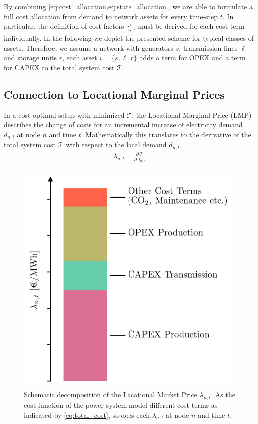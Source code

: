 \documentclass[11pt,twocolumn]{article}
\newcommand{\pdv}[2]{\frac{\partial #1}{\partial #2}}
\newcommand{\costfactor}{\gamma^\circ_{i,t}}
\newcommand{\lmp}[1][n]{\lambda_{#1,t}}
\newcommand{\demand}[1][n]{d_{#1,t}}
\newcommand{\totalcost}{\mathcal{T}}
\begin{document}
By combining \cref{eq:cost_allocation,eq:state_allocation}, we are able to formulate a full cost allocation from demand to network assets for every time-step $t$. In particular, the definition of cost factors $\costfactor$ must be derived for each cost term individually. 
In the following we depict the presented scheme for typical classes of assets. Therefore, we assume a network with generators $s$, transmission lines $\ell$ and storage units $r$, each asset $i = \{s, \ell, r\}$ adds a term for OPEX and a term for CAPEX to the total system cost $\totalcost$.  



\subsection{Connection to Locational Marginal Prices}

In a cost-optimal setup with minimized $\totalcost$, the Locational Marginal Price (LMP) describes the change of costs for an incremental increase of electricity demand $\demand$ at node $n$ and time $t$. Mathematically this translates to the derivative of the total system cost $\totalcost$ with respect to the local demand $\demand$
\begin{align}
\lmp = \pdv{\,\totalcost}{\,\demand}
\label{eq:lmp}
\end{align}
% 
\begin{figure}[h]
\centering
\includegraphics[width=.8\linewidth]{price_decomposition.png}
\caption{Schematic decomposition of the Locational Market Price $\lmp$. As the cost function of the power system model different cost terms as indicated by \cref{eq:total_cost}, so does each $\lmp$ at node $n$ and time $t$.}
\label{fig:price_decomposition}
\end{figure}
\end{document}

